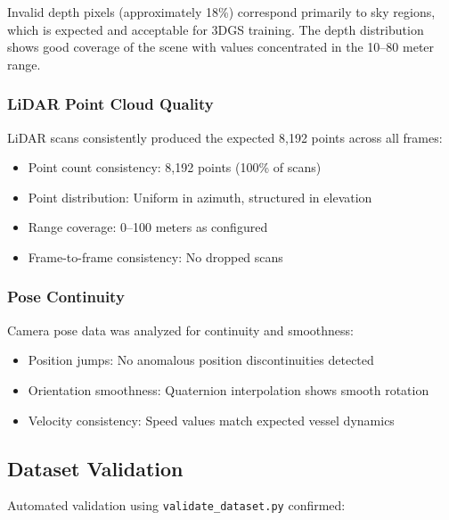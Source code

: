 Invalid depth pixels (approximately 18\%) correspond primarily to sky regions, which is expected and acceptable for 3DGS training. The depth distribution shows good coverage of the scene with values concentrated in the 10--80 meter range.

\subsubsection{LiDAR Point Cloud Quality}

LiDAR scans consistently produced the expected 8,192 points across all frames:

\begin{itemize}
    \item Point count consistency: 8,192 points (100\% of scans)
    \item Point distribution: Uniform in azimuth, structured in elevation
    \item Range coverage: 0--100 meters as configured
    \item Frame-to-frame consistency: No dropped scans
\end{itemize}

\subsubsection{Pose Continuity}

Camera pose data was analyzed for continuity and smoothness:

\begin{itemize}
    \item Position jumps: No anomalous position discontinuities detected
    \item Orientation smoothness: Quaternion interpolation shows smooth rotation
    \item Velocity consistency: Speed values match expected vessel dynamics
\end{itemize}

\subsection{Dataset Validation}

Automated validation using \texttt{validate\_dataset.py} confirmed:

